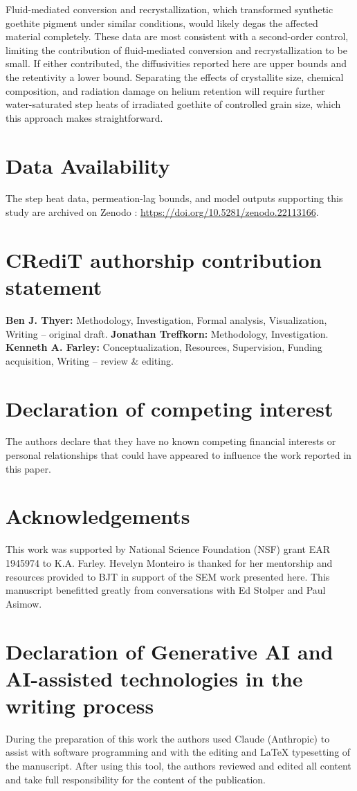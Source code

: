 Fluid-mediated conversion and recrystallization, which transformed synthetic goethite pigment under
similar conditions, would likely degas the affected material completely. These data are most consistent with 
a second-order control, limiting the contribution of fluid-mediated conversion and recrystallization to be small. 
If either contributed, the diffusivities reported here are upper bounds and the retentivity a lower bound. 
Separating the effects of crystallite size, chemical composition, and radiation damage on helium retention 
will require further water-saturated step heats of irradiated goethite of controlled grain size, 
which this approach makes straightforward.

\section*{Data Availability}

The step heat data, permeation-lag bounds, and model outputs supporting this study are archived
on Zenodo \citep{thyer2026data}: \url{https://doi.org/10.5281/zenodo.22113166}.

\section*{CRediT authorship contribution statement}

\textbf{Ben J. Thyer:} Methodology, Investigation, Formal analysis,
Visualization, Writing -- original draft. \textbf{Jonathan Treffkorn:} Methodology,
Investigation. \textbf{Kenneth A. Farley:} Conceptualization, Resources, Supervision, Funding
acquisition, Writing -- review \& editing.

\section*{Declaration of competing interest}

The authors declare that they have no known competing financial interests or personal
relationships that could have appeared to influence the work reported in this paper.

\section*{Acknowledgements}

This work was supported by National Science Foundation (NSF) grant EAR 1945974 to K.A. Farley.
Hevelyn Monteiro is thanked for her mentorship and resources provided to BJT in support of 
the SEM work presented here. This manuscript benefitted greatly from conversations with 
Ed Stolper and Paul Asimow. 

\section*{Declaration of Generative AI and AI-assisted technologies in the writing process}

During the preparation of this work the authors used Claude (Anthropic) to assist with software
programming and with the editing and LaTeX typesetting of the manuscript. After using this tool, the
authors reviewed and edited all content and take full responsibility for the content of
the publication.
